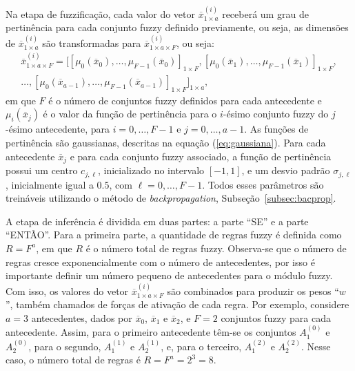 Na etapa de fuzzificação, cada valor do vetor $\overline{x}^{(i)}_{1\times a}$ receberá um grau de pertinência para cada conjunto fuzzy definido previamente, ou seja, as dimensões de $\overline{x}^{(i)}_{1\times a}$ são transformadas para $\overline{x}^{(i)}_{1\times a \times F}$, ou seja:  
\begin{equation*}
\begin{split}
\overline{x}^{(i)}_{1\times a \times F}= \bigg[[\mu_0(\overline{x}_0), \hdots, \mu_{F-1}(\overline{x}_0)]_{1\times F},[\mu_0(\overline{x}_1), \hdots, \mu_{F-1}(\overline{x}_1)]_{1\times F}, \\
\hdots, [\mu_0(\overline{x}_{a-1}), \hdots, \mu_{F-1}(\overline{x}_{a-1})]_{1\times F}\bigg]_{1\times a},
\end{split}
\end{equation*}
em que $F$ é o número de conjuntos fuzzy definidos para cada antecedente e $\mu_i(\overline{x}_j)$ é o valor da função de pertinência para o $i$-ésimo conjunto fuzzy do $j$-ésimo antecedente, para $i = 0, \hdots, F-1$ e $j = 0, \hdots, a-1$. As funções de pertinência são gaussianas, descritas na equação (\ref{eq:gaussiana}). Para cada antecedente $\overline{x}_j$ e para cada conjunto fuzzy associado, a função de pertinência possui um centro $c_{j,\ell}$, inicializado no intervalo $[-1,1]$, e um desvio padrão $\sigma_{j,\ell}$, inicialmente igual a $0.5$, com $\ell = 0, \hdots, F-1$. Todos esses parâmetros são treináveis utilizando o método de \textit{backpropagation}, Subseção~\ref{subsec:bacprop}.

A etapa de inferência é dividida em duas partes: a parte ``SE'' e a parte ``ENTÃO''. Para a primeira parte, a quantidade de regras fuzzy é definida como $R = F^a$, em que $R$ é o número total de regras fuzzy. Observa-se que o número de regras cresce exponencialmente com o número de antecedentes, por isso é importante definir um número pequeno de antecedentes para o módulo fuzzy. Com isso, os valores do vetor $\overline{x}^{(i)}_{1\times a \times F}$ são combinados para produzir os pesos ``$w$'', também chamados de forças de ativação de cada regra. 
Por exemplo, considere $a=3$ antecedentes, dados por
$\overline{x}_0$, $\overline{x}_1$ e $\overline{x}_2$, e $F=2$
conjuntos fuzzy para cada antecedente. Assim, para o primeiro
antecedente têm-se os conjuntos $A^{(0)}_1$ e $A^{(0)}_2$, para o segundo, $A^{(1)}_1$ e $A^{(1)}_2$, e, para o terceiro,
$A^{(2)}_1$ e $A^{(2)}_2$. Nesse caso, o número total de regras é
$R = F^a = 2^3 = 8$.

